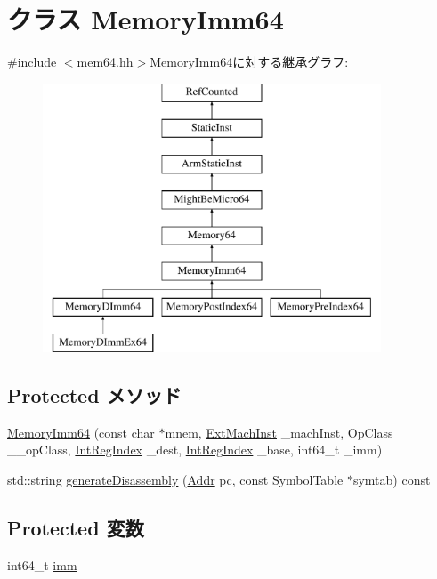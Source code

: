 \hypertarget{classArmISA_1_1MemoryImm64}{
\section{クラス MemoryImm64}
\label{classArmISA_1_1MemoryImm64}
}


{\ttfamily \#include $<$mem64.hh$>$}MemoryImm64に対する継承グラフ:\begin{figure}[H]
\begin{center}
\leavevmode
\includegraphics[height=8cm]{classArmISA_1_1MemoryImm64}
\end{center}
\end{figure}
\subsection*{Protected メソッド}
\begin{DoxyCompactItemize}
\item 
\hyperlink{classArmISA_1_1MemoryImm64_a0212f5a4085b707ee10f07f63f903594}{MemoryImm64} (const char $\ast$mnem, \hyperlink{classStaticInst_a5605d4fc727eae9e595325c90c0ec108}{ExtMachInst} \_\-machInst, OpClass \_\-\_\-opClass, \hyperlink{namespaceArmISA_ae64680ba9fb526106829d6bf92fc791b}{IntRegIndex} \_\-dest, \hyperlink{namespaceArmISA_ae64680ba9fb526106829d6bf92fc791b}{IntRegIndex} \_\-base, int64\_\-t \_\-imm)
\item 
std::string \hyperlink{classArmISA_1_1MemoryImm64_a95d323a22a5f07e14d6b4c9385a91896}{generateDisassembly} (\hyperlink{classm5_1_1params_1_1Addr}{Addr} pc, const SymbolTable $\ast$symtab) const 
\end{DoxyCompactItemize}
\subsection*{Protected 変数}
\begin{DoxyCompactItemize}
\item 
int64\_\-t \hyperlink{classArmISA_1_1MemoryImm64_a11b34c3ceec32cc1f14d0ca9c099c470}{imm}
\end{DoxyCompactItemize}



